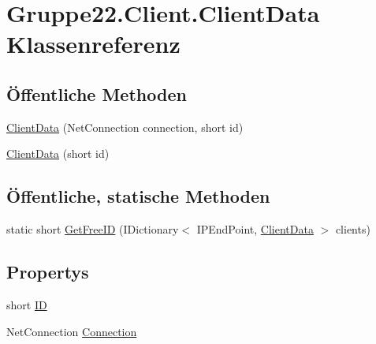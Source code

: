 \hypertarget{class_gruppe22_1_1_client_1_1_client_data}{\section{Gruppe22.\-Client.\-Client\-Data Klassenreferenz}
\label{class_gruppe22_1_1_client_1_1_client_data}
}
\subsection*{Öffentliche Methoden}
\begin{DoxyCompactItemize}
\item 
\hyperlink{class_gruppe22_1_1_client_1_1_client_data_a79cddbe39d082ab43605afe34418c0da}{Client\-Data} (Net\-Connection connection, short id)
\item 
\hyperlink{class_gruppe22_1_1_client_1_1_client_data_aa4332b19abcafdc627f586c51063004f}{Client\-Data} (short id)
\end{DoxyCompactItemize}
\subsection*{Öffentliche, statische Methoden}
\begin{DoxyCompactItemize}
\item 
static short \hyperlink{class_gruppe22_1_1_client_1_1_client_data_afdd6d5f3a53ecafa6261c2c4f806a261}{Get\-Free\-I\-D} (I\-Dictionary$<$ I\-P\-End\-Point, \hyperlink{class_gruppe22_1_1_client_1_1_client_data}{Client\-Data} $>$ clients)
\end{DoxyCompactItemize}
\subsection*{Propertys}
\begin{DoxyCompactItemize}
\item 
short \hyperlink{class_gruppe22_1_1_client_1_1_client_data_acafb077462c35a4455699df5dac0dc71}{I\-D}
\item 
Net\-Connection \hyperlink{class_gruppe22_1_1_client_1_1_client_data_a73bd7a2152619a6f3a82c529153e680f}{Connection}
\end{DoxyCompactItemize}


